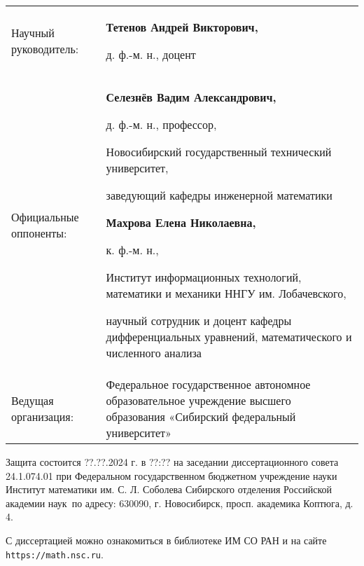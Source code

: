 \documentclass[a5paper,9pt,twoside]{extarticle} %
\begin{document}
\vspace{0.008\paperheight plus1fill}
\noindent%
\begin{tabular}{p{} p{}}
Научный руководитель: & \textbf{Тетенов Андрей Викторович,}\par
д. ф.-м. н., доцент

\vspace{0.013\paperheight}\\
Официальные оппоненты: &
{%
\textbf{Селезнёв Вадим Александрович,}\par
д. ф.-м. н., профессор,\par
Новосибирский государственный технический университет,\par
заведующий кафедры инженерной математики\par
\vspace{0.01\paperheight}
\textbf{Махрова Елена Николаевна,}\par
к. ф.-м. н.,\par
Институт информационных технологий, математики и механики ННГУ им. Лобачевского,\par
научный сотрудник и доцент кафедры дифференциальных уравнений, математического и численного анализа

}%
\vspace{0.013\paperheight} \\
Ведущая организация: &
Федеральное государственное автономное образовательное учреждение высшего образования «Сибирский федеральный университет»
\end{tabular}
\vspace{0.008\paperheight plus1fill}

\noindent Защита состоится ??.??.2024 г. в ??:?? на заседании диссертационного совета 24.1.074.01 при Федеральном государственном бюджетном учреждение науки
Институт математики им. С. Л. Соболева Сибирского отделения Российской академии наук~по адресу: 630090, г. Новосибирск, просп. академика Коптюга, д. 4.

\vspace{0.008\paperheight plus1fill}
\noindent С диссертацией можно ознакомиться в библиотеке ИМ СО РАН и на сайте \texttt{https://math.nsc.ru}.

\end{document}
